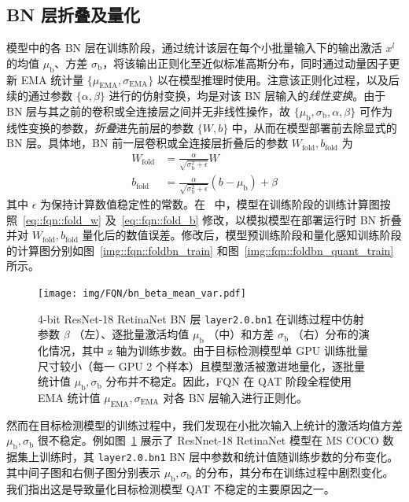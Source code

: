 \documentclass[
  fontset = mac,
]{shtthesis}
\providecommand{\EMA}[1]{{ #1 }_{\mathrm{EMA}}}
\providecommand{\Batch}[1]{{ #1 }_{\mathrm{b}}}
\providecommand{\Fold}[1]{{ #1 }_{\mathrm{fold}}}
\begin{document}
\subsection{BN 层折叠及量化} \label{sec::fqn::q_bn}
模型中的各 BN 层在训练阶段，通过统计该层在每个小批量输入下的输出激活 $x^l$ 的均值 $\Batch{\mu}$、方差 $\Batch{\sigma}$，将该输出正则化至近似标准高斯分布，同时通过动量因子更新 EMA 统计量 $\{\EMA{\mu}, \EMA{\sigma}\}$ 以在模型推理时使用。注意该正则化过程，以及后续的通过参数 $\{\alpha, \beta\}$ 进行的仿射变换，均是对该 BN 层输入的\emph{线性变换}。由于 BN 层与其之前的卷积或全连接层之间并无非线性操作，故 $\{\Batch{\mu}, \Batch{\sigma}, \alpha, \beta\}$ 可作为线性变换的参数，\emph{折叠}进先前层的参数 $\{W, b\}$ 中，从而在模型部署前去除显式的 BN 层。具体地，BN 前一层卷积或全连接层折叠后的参数 $\Fold{W}, \Fold{b}$ 为
\begin{align}
  \Fold{W} &= \frac{\alpha}{\sqrt{\Batch{\sigma}^2 + \epsilon}} W \label{eq::fqn::fold_w} \\
  \Fold{b} &= \frac{\alpha}{\sqrt{\Batch{\sigma}^2 + \epsilon}} (b - \Batch{\mu}) + \beta \label{eq::fqn::fold_b}
\end{align}
其中 $\epsilon$ 为保持计算数值稳定性的常数。在~\citet{jacob2018quantization, krishnamoorthi2018quantizing} 中，模型在训练阶段的训练计算图按照~\eqref{eq::fqn::fold_w} 及~\eqref{eq::fqn::fold_b} 修改，以模拟模型在部署运行时 BN 折叠并对 $\Fold{W}, \Fold{b}$ 量化后的数值误差。修改后，模型预训练阶段和量化感知训练阶段的计算图分别如图~\ref{img::fqn::foldbn_train} 和图~\ref{img::fqn::foldbn_quant_train} 所示。

\begin{figure}[htb]
  \centering
  \texttt{[image: img/FQN/bn\_beta\_mean\_var.pdf]}
  \caption{4-bit ResNet-18 RetinaNet BN 层 \texttt{layer2.0.bn1} 在训练过程中仿射参数 $\beta$ （左）、逐批量激活均值 $\Batch{\mu}$ （中）和方差 $\Batch{\sigma}$ （右）分布的演化情况，其中 z 轴为训练步数。由于目标检测模型单 GPU 训练批量尺寸较小（每一 GPU 2 个样本）且模型激活被激进地量化，逐批量统计值 $\Batch{\mu}, \Batch{\sigma}$ 分布并不稳定。因此，FQN 在 QAT 阶段全程使用 EMA 统计值 $\EMA{\mu}, \EMA{\sigma}$ 对各 BN 层输入进行正则化。}
  \label{img::fqn::bn_stat}
\end{figure}

然而在目标检测模型的训练过程中，我们发现在小批次输入上统计的激活均值方差 $\Batch{\mu}, \Batch{\sigma}$ 很不稳定。例如图~\ref{img::fqn::bn_stat} 展示了 ResNnet-18 RetinaNet 模型在 MS COCO 数据集上训练时，其 \verb|layer2.0.bn1| BN 层中参数和统计值随训练步数的分布变化。其中间子图和右侧子图分别表示 $\Batch{\mu}, \Batch{\sigma}$ 的分布，其分布在训练过程中剧烈变化。我们指出这是导致量化目标检测模型 QAT 不稳定的主要原因之一。
\end{document}
